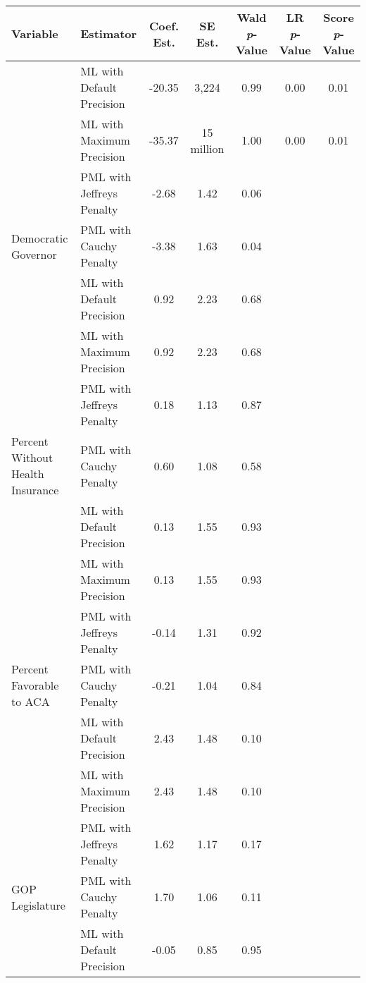 
\begin{tabular}{llccccc}
\toprule
Variable & Estimator & Coef. Est. & SE Est. & Wald \textit{p}-Value & LR \textit{p}-Value & Score \textit{p}-Value\\
\midrule
 & ML with Default Precision & -20.35 & 3,224 & 0.99 & 0.00 & 0.01\\

 & ML with Maximum Precision & -35.37 & 15 million & 1.00 & 0.00 & 0.01\\

 & PML with Jeffreys Penalty & -2.68 & 1.42 & 0.06 &  & \\

\multirow{-4}{*}{\raggedright\arraybackslash Democratic Governor} & PML with Cauchy Penalty & -3.38 & 1.63 & 0.04 &  & \\
\cmidrule{1-7}
 & ML with Default Precision & 0.92 & 2.23 & 0.68 &  & \\

 & ML with Maximum Precision & 0.92 & 2.23 & 0.68 &  & \\

 & PML with Jeffreys Penalty & 0.18 & 1.13 & 0.87 &  & \\

\multirow{-4}{*}{\raggedright\arraybackslash Percent Without Health Insurance} & PML with Cauchy Penalty & 0.60 & 1.08 & 0.58 &  & \\
\cmidrule{1-7}
 & ML with Default Precision & 0.13 & 1.55 & 0.93 &  & \\

 & ML with Maximum Precision & 0.13 & 1.55 & 0.93 &  & \\

 & PML with Jeffreys Penalty & -0.14 & 1.31 & 0.92 &  & \\

\multirow{-4}{*}{\raggedright\arraybackslash Percent Favorable to ACA} & PML with Cauchy Penalty & -0.21 & 1.04 & 0.84 &  & \\
\cmidrule{1-7}
 & ML with Default Precision & 2.43 & 1.48 & 0.10 &  & \\

 & ML with Maximum Precision & 2.43 & 1.48 & 0.10 &  & \\

 & PML with Jeffreys Penalty & 1.62 & 1.17 & 0.17 &  & \\

\multirow{-4}{*}{\raggedright\arraybackslash GOP Legislature} & PML with Cauchy Penalty & 1.70 & 1.06 & 0.11 &  & \\
\cmidrule{1-7}
 & ML with Default Precision & -0.05 & 0.85 & 0.95 &  & \\


\end{tabular}
